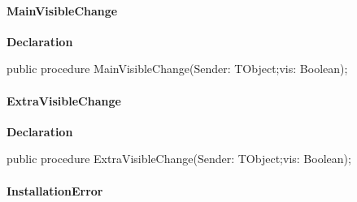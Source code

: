 \documentclass{report}
\newif\ifpdf
\begin{document}
\paragraph*{MainVisibleChange}\hspace*{\fill}

\label{igobase.TIWizFrm-MainVisibleChange}
\begin{list}{}{
\setlength{\itemindent}{0cm}
\setlength{\listparindent}{0cm}
\setlength{\leftmargin}{\evensidemargin}
\addtolength{\leftmargin}{\tmplength}
\settowidth{\labelsep}{X}
\addtolength{\leftmargin}{\labelsep}
\setlength{\labelwidth}{\tmplength}
}
\item[\textbf{Declaration}\hfill]
\ifpdf
\begin{flushleft}
\fi
\begin{ttfamily}
public procedure MainVisibleChange(Sender: TObject;vis: Boolean);\end{ttfamily}

\ifpdf
\end{flushleft}
\fi

\end{list}
\paragraph*{ExtraVisibleChange}\hspace*{\fill}

\label{igobase.TIWizFrm-ExtraVisibleChange}
\begin{list}{}{
\setlength{\itemindent}{0cm}
\setlength{\listparindent}{0cm}
\setlength{\leftmargin}{\evensidemargin}
\addtolength{\leftmargin}{\tmplength}
\settowidth{\labelsep}{X}
\addtolength{\leftmargin}{\labelsep}
\setlength{\labelwidth}{\tmplength}
}
\item[\textbf{Declaration}\hfill]
\ifpdf
\begin{flushleft}
\fi
\begin{ttfamily}
public procedure ExtraVisibleChange(Sender: TObject;vis: Boolean);\end{ttfamily}

\ifpdf
\end{flushleft}
\fi

\end{list}
\paragraph*{InstallationError}\hspace*{\fill}
\end{document}
